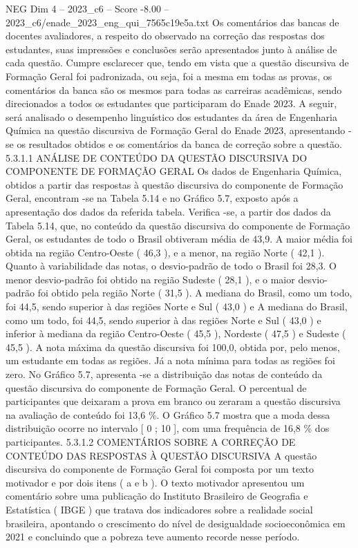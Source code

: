 \begin{textsample}{NEG Dim 4 – 2023\_c6 – Score -8.00 – 2023\_c6/enade\_2023\_eng\_qui\_7565c19e5a.txt}
Os comentários das bancas de docentes avaliadores, a respeito do observado na correção das respostas dos estudantes, suas impressões e conclusões serão apresentados junto à análise de cada questão.
Cumpre esclarecer que, tendo em vista que a questão discursiva de Formação Geral foi padronizada, ou seja, foi a mesma em todas as provas, os comentários da banca são os mesmos para todas as carreiras acadêmicas, sendo direcionados a todos os estudantes que participaram do Enade 2023.
A seguir, será analisado o desempenho linguístico dos estudantes da área de Engenharia Química na questão discursiva de Formação Geral do Enade 2023, apresentando -se os resultados obtidos e os comentários da banca de correção sobre a questão. 5.3.1.1 ANÁLISE DE CONTEÚDO DA QUESTÃO DISCURSIVA DO COMPONENTE DE FORMAÇÃO GERAL Os dados de Engenharia Química, obtidos a partir das respostas à questão discursiva do componente de Formação Geral, encontram -se na Tabela 5.14 e no Gráfico 5.7, exposto após a apresentação dos dados da referida tabela.
Verifica -se, a partir dos dados da Tabela 5.14, que, no conteúdo da questão discursiva do componente de Formação Geral, os estudantes de todo o Brasil obtiveram média de 43,9.
A maior média foi obtida na região Centro-Oeste ( 46,3 ), e a menor, na região Norte ( 42,1 ).
Quanto à variabilidade das notas, o desvio-padrão de todo o Brasil foi 28,3.
O menor desvio-padrão foi obtido na região Sudeste ( 28,1 ), e o maior desvio-padrão foi obtido pela região Norte ( 31,5 ).
A mediana do Brasil, como um todo, foi 44,5, sendo superior à das regiões Norte e Sul ( 43,0 ) e A mediana do Brasil, como um todo, foi 44,5, sendo superior à das regiões Norte e Sul ( 43,0 ) e inferior à mediana da região Centro-Oeste ( 45,5 ), Nordeste ( 47,5 ) e Sudeste ( 45,5 ).
A nota máxima da questão discursiva foi 100,0, obtida por, pelo menos, um estudante em todas as regiões.
Já a nota mínima para todas as regiões foi zero.
No Gráfico 5.7, apresenta -se a distribuição das notas de conteúdo da questão discursiva do componente de Formação Geral.
O percentual de participantes que deixaram a prova em branco ou zeraram a questão discursiva na avaliação de conteúdo foi 13,6 \%.
O Gráfico 5.7 mostra que a moda dessa distribuição ocorre no intervalo [ 0 ; 10 ], com uma frequência de 16,8 \% dos participantes. 5.3.1.2 COMENTÁRIOS SOBRE A CORREÇÃO DE CONTEÚDO DAS RESPOSTAS À QUESTÃO DISCURSIVA A questão discursiva do componente de Formação Geral foi composta por um texto motivador e por dois itens ( a e b ).
O texto motivador apresentou um comentário sobre uma publicação do Instituto Brasileiro de Geografia e Estatística ( IBGE ) que tratava dos indicadores sobre a realidade social brasileira, apontando o crescimento do nível de desigualdade socioeconômica em 2021 e concluindo que a pobreza teve aumento recorde nesse período.

\end{textsample}
